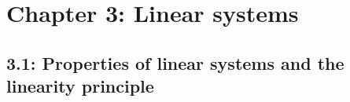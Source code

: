 \documentclass{article}
\begin{document}
\section{Chapter 3: Linear systems}

\subsection{3.1: Properties of linear systems and the linearity principle}
\end{document}
